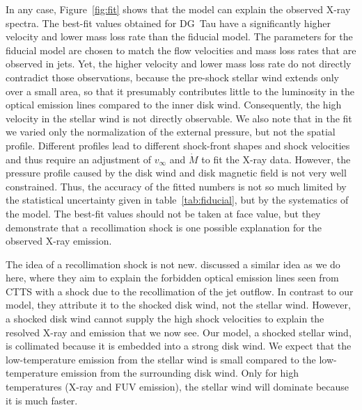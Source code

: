 \documentclass[manuscript]{aastex}
\begin{document}
In any case, Figure~\ref{fig:fit} shows that the model can explain the observed X-ray spectra. The best-fit values obtained for DG~Tau have a significantly higher velocity and lower mass loss rate than the fiducial model. The parameters for the fiducial model are chosen to match the flow velocities and mass loss rates that are observed in jets. Yet, the higher velocity and lower mass loss rate do not directly contradict those observations, because the pre-shock stellar wind extends only over a small area, so that it presumably contributes little to the luminosity in the optical emission lines compared to the inner disk wind. Consequently, the high velocity in the stellar wind is not directly observable. We also note that in the fit we varied only the normalization of the external pressure, but not the spatial profile. Different profiles lead to different shock-front shapes and shock velocities and thus require an adjustment of $v_\infty$ and $\dot M$ to fit the X-ray data. However, the pressure profile caused by the disk wind and disk magnetic field is not very well constrained. Thus, the accuracy of the fitted numbers is not so much limited by the statistical uncertainty given in table~\ref{tab:fiducial}, but by the systematics of the model. The best-fit values should not be taken at face value, but they demonstrate that a recollimation shock is one possible explanation for the observed X-ray emission. 

The idea of a recollimation shock is not new.
\citet{1993ApJ...409..748G} discussed a similar idea as we do here, where they aim to explain the forbidden optical emission lines seen from CTTS with a shock due to the recollimation of the jet outflow. In contrast to our model, they attribute it to the shocked disk wind, not the stellar wind. However, a shocked disk wind cannot supply the high shock velocities to explain the resolved X-ray and  emission that we now see. Our model, a shocked stellar wind, is collimated because it is embedded into a strong disk wind. We expect that the low-temperature emission from the stellar wind is small compared to the low-temperature emission from the surrounding disk wind. Only for high temperatures (X-ray and FUV emission), the stellar wind will dominate because it is much faster.
\end{document}
